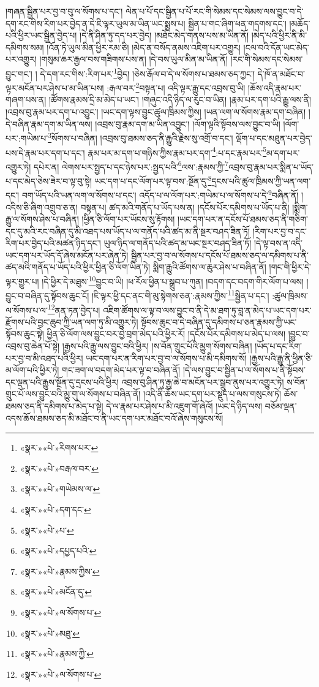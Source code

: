 །གཞན་སྦྱིན་པར་བྱ་བ་བུ་ལ་སོགས་པ་དང་། ལེན་པ་པོ་དང་སྦྱིན་པ་པོ་རང་གི་སེམས་དང་སེམས་ལས་བྱུང་བ་དེ་དག་རང་གིས་རིག་པར་བྱེད་ན་དེ་ཇི་ལྟར་ཡུལ་མ་ཡིན་ཡང་སྨྲས་པ། སྦྱིན་པ་གང་ཞིག་ཕན་གདགས་དང་། །མཆོད་པའི་ཕྱིར་ཡང་སྦྱིན་བྱེད་པ། །དེ་ནི་ཤིན་ཏུ་དད་པར་བྱེད། །མཐོང་མེད་གནས་པས་མ་ཡིན་ནོ། །མེད་པའི་ཕྱིར་ནི་མི་དམིགས་སམ། །འོན་ཏེ་ཡུལ་མིན་ཕྱིར་རམ་ཅི། །མེད་ན་བསོད་ནམས་འཇིག་པར་འགྱུར། །ངལ་བའི་དོན་ཡང་མེད་པར་འགྱུར། །གསུམ་ཆར་རྒྱལ་བས་གཟིགས་པས་ན། །དེ་བས་ཡུལ་མིན་མ་ཡིན་ནོ། །རང་གི་སེམས་དང་སེམས་བྱུང་གང་། །
དེ་དག་རང་གིས་:རིག་པར་\footnote{«སྣར་»«པེ་»རིགས་པར་}བྱེད། །ཅེས་རྒོལ་བ་དེ་ལ་སོགས་པ་ཐམས་ཅད་ཀྱང་། དེ་ཁོ་ན་མཐོང་བ་ལྟར་མངོན་པར་ཤེས་པ་མ་ཡིན་པས། :རྒལ་བར་\footnote{«སྣར་»«པེ་»བརྒལ་བར་}བསྟན་པ། འདི་ལྟར་རྒྱུ་དང་འབྲས་བུ་ཡི། །ཆོས་འདི་རྣམ་པར་གཞག་པས་ན། །ཚོགས་རྣམས་དྲི་མ་མེད་པ་ཡང་། །གཞུང་འདི་ཉིད་ལ་རུང་བ་ཡིན། །རྣམ་པར་དག་པའི་རྒྱུ་ལས་ནི། །འབྲས་བུ་རྣམ་པར་དག་པ་འབྱུང་། །ཡང་དག་ལྟས་བྱུང་ཚུལ་ཁྲིམས་ཀྱིས། །ཡན་ལག་ལ་སོགས་རྣམ་དག་བཞིན། །དེ་བཞིན་རྣམ་དག་མ་ཡིན་ལས། །འབྲས་བུ་རྣམ་དག་མ་ཡིན་འབྱུང་། །ལོག་ལྟའི་སྟོབས་ལས་བྱུང་བ་ཡི། །ལོག་པར་:གཡེམ་པ་\footnote{«སྣར་»«པེ་»གཡེམས་ལ་}སོགས་པ་བཞིན། །འབྲས་བུ་ཐམས་ཅད་ནི་རྒྱུའི་རྗེས་སུ་འགྲོ་བ་དང་། ལྡོག་པ་དང་མཐུན་པར་བྱེད་པས་དེ་རྣམ་པར་དག་པ་དང་། རྣམ་པར་མ་དག་པ་གཉིས་ཀྱིས་རྣམ་པར་དག་\footnote{«སྣར་»«པེ་»དག་དང་}:པ་དང་རྣམ་པར་\footnote{«སྣར་»«པེ་»པ་}མ་དག་པར་འགྱུར་ཏེ། དཔེར་ན། ལེགས་པར་སྤྱད་པ་དང་ཉེས་པར་:སྤྱད་པའི་\footnote{«སྣར་»«པེ་»དཔྱད་པའི་}ལས་:རྣམས་ཀྱི་\footnote{«སྣར་»«པེ་»རྣམས་ཀྱིས་}འབྲས་བུ་རྣམ་པར་སྨིན་པ་ཡོད་པ་དང་མེད་ཅེས་ཟེར་བ་ལྟ་བུ་སྟེ། ཡང་དག་པ་དང་ལོག་པར་ལྟ་བས་:སྔོན་དུ་\footnote{«སྣར་»«པེ་»མངོན་དུ་}དྲངས་པའི་ཚུལ་ཁྲིམས་ཀྱི་ཡན་ལག་དང་། བག་ཡོད་པའི་ཡན་ལག་ལ་སོགས་པ་དང་། འདོད་པ་ལ་ལོག་པར་:གཡེམ་པ་ལ་སོགས་པ་དེ་\footnote{«སྣར་»«པེ་»ལ་སོགས་པ་}བཞིན་ནོ། །འདིས་ཅི་ཞིག་འགྲུབ་ཅ་ན། བསྟན་པ། ཚད་མའི་གནོད་པ་ཡོད་པས་ན། །དངོས་པོར་དམིགས་པ་ཡོད་པ་ནི། །སྨིག་རྒྱུ་ལ་སོགས་ཤེས་པ་བཞིན། །ཕྱིན་ཅི་ལོག་པར་ཡོངས་སུ་རྟོགས། །ཡང་དག་པར་ན་དངོས་པོ་ཐམས་ཅད་ནི་གཅིག་དང་དུ་མའི་རང་བཞིན་དུ་མི་འཐད་པས་ཡོད་པ་ལ་གནོད་པའི་ཚད་མ་ནི་སྔར་བཤད་ཟིན་ཏོ། །རིག་པར་བྱ་བ་དང་རིག་པར་བྱེད་པའི་མཚན་ཉིད་དང་། ཡུལ་ཉིད་ལ་གནོད་པའི་ཚད་མ་ཡང་སྔར་བཤད་ཟིན་ཏོ། །དེ་ལྟ་བས་ན་འདི་ཡང་དག་པར་ཡོད་དོ་ཞེས་མངོན་པར་ཞེན་ཏེ། སྦྱིན་པར་བྱ་བ་ལ་སོགས་པ་དངོས་པོ་ཐམས་ཅད་ལ་དམིགས་པ་ནི་ཚད་མའི་གནོད་པ་ཡོད་པའི་ཕྱིར་ཕྱིན་ཅི་ལོག་ཡིན་ཏེ། སྨིག་རྒྱུའི་ཚོགས་ལ་ཆུར་ཤེས་པ་བཞིན་ནོ། །གང་གི་ཕྱིར་དེ་ལྟར་གྱུར་པ། །དེ་ཕྱིར་དེ་མཐུས་\footnote{«སྣར་»«པེ་»མཐུ་}བྱུང་བ་ཡི། །ཕ་རོལ་ཕྱིན་པ་སྒྲུབ་པ་ཀུན། །བདག་དང་བདག་གིར་ལོག་པ་ལས། །བྱུང་བ་བཞིན་དུ་སྟོབས་ཆུང་ངོ། །ཇི་ལྟར་ཕྱི་དང་ནང་གི་མུ་སྟེགས་ཅན་:རྣམས་ཀྱིས་\footnote{«སྣར་»«པེ་»རྣམས་ཀྱི་}སྦྱིན་པ་དང་། :ཚུལ་ཁྲིམས་ལ་སོགས་པ་ལ་\footnote{«སྣར་»«པེ་»ལ་སོགས་པ་}ནན་ཏན་བྱེད་པ། འཇིག་ཚོགས་ལ་ལྟ་བ་ལས་བྱུང་བ་ནི་དེ་མ་ཐག་ཏུ་བླ་ན་མེད་པ་ཡང་དག་པར་རྫོགས་པའི་བྱང་ཆུབ་ཀྱི་ཡན་ལག་ཏུ་མི་འགྱུར་ཏེ། སྟོབས་ཆུང་བ་དེ་བཞིན་དུ་དམིགས་པ་ཅན་རྣམས་ཀྱི་ཡང་སྟོབས་ཆུང་སྟེ། ཕྱིན་ཅི་ལོག་ལས་བྱུང་བར་བྱེ་བྲག་མེད་པའི་ཕྱིར་རོ། །དངོས་པོར་དམིགས་པ་མེད་པ་ལས། །བྱུང་བ་འབྲས་བུ་ཆེན་པོ་སྟེ། །རྒྱས་པའི་རྒྱུ་ལས་བྱུང་བའི་ཕྱིར། །ས་བོན་གྲུང་པོའི་མྱུག་སོགས་བཞིན། །ཡོད་པ་དང་རིག་པར་བྱ་བ་མི་འཐད་པའི་ཕྱིར། ཡང་དག་པར་ན་རིག་པར་བྱ་བ་ལ་སོགས་པ་མི་དམིགས་སོ། །རྒྱས་པའི་རྒྱུ་ནི་ཕྱིན་ཅི་མ་ལོག་པའི་ཕྱིར་ཏེ། གང་ཟག་ལ་བདག་མེད་པར་ལྟ་བ་བཞིན་ནོ། །དེ་ལས་བྱུང་བ་སྦྱིན་པ་ལ་སོགས་པ་ནི་སྟོབས་དང་ལྡན་པའི་རྒྱུས་སྔོན་དུ་དྲངས་པའི་ཕྱིར། འབྲས་བུ་ཤིན་ཏུ་རྒྱ་ཆེ་བ་མངོན་པར་སྒྲུབ་ནུས་པར་འགྱུར་ཏེ། ས་བོན་གྲུང་པོ་ལས་བྱུང་བའི་མྱུ་གུ་ལ་སོགས་པ་བཞིན་ནོ། །འདི་ནི་ཆོས་ཡང་དག་པར་སྡུད་པ་ལས་གསུངས་ཏེ། ཆོས་ཐམས་ཅད་ནི་དམིགས་པ་མེད་པ་སྟེ། དེ་ལ་རྣམ་པར་ཤེས་པ་མི་འཇུག་གོ་ཞེའོ། །ཡང་དེ་ཉིད་ལས། བཅོམ་ལྡན་འདས་ཆོས་ཐམས་ཅད་མི་མཐོང་བ་ནི་ཡང་དག་པར་མཐོང་བའོ་ཞེས་གསུངས་སོ། 